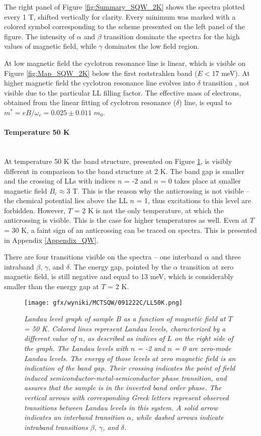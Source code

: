 \documentclass[titlepage,a4paper]{book}
\newcommand{\wciecie}{\quad\phantom{v}}
\newcommand{\myparagraph}[1]{\paragraph{#1}\mbox{}\\}
\begin{document}
The right panel of Figure \ref{fig:Summary_SQW_2K} shows the spectra plotted every 1 T, shifted vertically for clarity. Every minimum was marked with a colored symbol corresponding to the scheme presented on the left panel of the figure. The intensity of $\alpha$ and $\beta$ transition dominate the spectra for the high values of magnetic field, while $\gamma$ dominates the low field region.

At low magnetic field the cyclotron resonance line is linear, which is visible on Figure \ref{fig:Map_SQW_2K} below the first reststrahlen band ($E < 17$ meV). At higher magnetic field the cyclotron resonance line evolves into $\delta$ transition \cite{Orlita_MCT_QW}, not visible due to the particular LL filling factor. The effective mass of electrons, obtained from the linear fitting of cyclotron resonance ($\delta$) line, is equal to $m^* = eB/\omega_c = 0.025 \pm 0.011$ $m_0$.

\clearpage
\myparagraph{Temperature 50 K}
\wciecie
At temperature 50 K the band structure, presented on Figure \ref{fig:LL_SQW_50K}, is visibly different in comparison to the band structure at 2 K. The band gap is smaller and the crossing of LLs with indices $n$ = -2 and $n$ = 0 takes place at smaller magnetic field $B_c \approx 3$ T. This is the reason why the anticrossing is not visible -- the chemical potential lies above the LL $n$ = 1, thus excitations to this level are forbidden. However, $T$ = 2 K is not the only temperature, at which the anticrossing is visible. This is the case for higher temperatures as well. Even at $T$ = 30 K, a faint sign of an anticrossing can be traced on spectra. This is presented in Appendix \ref{Appendix_QW}.

There are four transitions visible on the spectra -- one interband $\alpha$ and three intraband $\beta$, $\gamma$, and $\delta$. The energy gap, pointed by the $\alpha$ transition at zero magnetic field, is still negative and equal to 13 meV, which is considerably smaller than the energy gap at $T$ = 2 K.

\begin{figure}[ht]
	\centering
	\texttt{[image: gfx/wyniki/MCTSQW/091222C/LL50K.png]}
	\vspace{-10pt}
	\caption{\textit{Landau level graph of sample B as a function of magnetic field at $T$ = 50 K. Colored lines represent Landau levels, characterized by a different value of $n$, as described as indices of $L$ on the right side of the graph. The Landau levels with $n$ = -2 and $n$ = 0 are zero-mode Landau levels. The energy of those levels at zero magnetic field is an indication of the band gap. Their crossing indicates the point of field induced semiconductor-metal-semiconductor phase transition, and assures that the sample is in the inverted band order phase. The vertical arrows with corresponding Greek letters represent observed transitions between Landau levels in this system. A solid arrow indicates an interband transition $\alpha$, while dashed arrows indicate intraband transitions $\beta$, $\gamma$, and $\delta$.}}
	\label{fig:LL_SQW_50K}
\end{figure}
\end{document}
